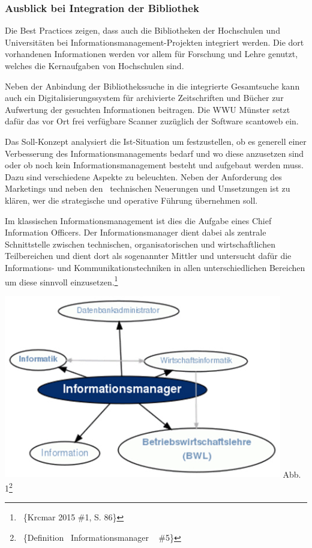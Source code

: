 \documentclass[a4paper]{article}
\begin{document}
\subsubsection{Ausblick bei Integration der Bibliothek}
{\sffamily
Die Best Practices zeigen, dass auch die Bibliotheken der Hochschulen und Universitäten bei
Informationsmanagement-Projekten integriert werden. Die dort vorhandenen Informationen werden vor allem für Forschung
und Lehre genutzt, welches die Kernaufgaben von Hochschulen sind.}

{\sffamily
Neben der Anbindung der Bibliothekssuche in die integrierte Gesamtsuche kann auch ein Digitalisierungssystem für
archivierte Zeitschriften und Bücher zur Aufwertung der gesuchten Informationen beitragen. Die WWU Münster setzt dafür
das vor Ort frei verfügbare Scanner zuzüglich der Software scantoweb ein.}


{\sffamily
Das Soll-Konzept analysiert die Ist-Situation um festzustellen, ob es generell einer Verbesserung des
Informationsmanagements bedarf und wo diese anzusetzen sind oder ob noch kein Informationsmanagement besteht und
aufgebaut werden muss. Dazu sind verschiedene Aspekte zu beleuchten. Neben der Anforderung des Marketings und neben den
\ technischen Neuerungen und Umsetzungen ist zu klären, wer die strategische und operative Führung übernehmen soll. }

\textsf{Im klassischen Informationsmanagement ist dies die Aufgabe eines Chief Information Officers. Der
Informationsmanager dient dabei als zentrale Schnittstelle zwischen technischen, organisatorischen und wirtschaftlichen
Teilbereichen und dient dort als sogenannter Mittler und untersucht dafür die Informations- und Kommunikationstechniken
in allen unterschiedlichen Bereichen um diese sinnvoll einzusetzen.}\footnote{\ \{Krcmar 2015 \#1, S. 86\}}

{\centering

\includegraphics[width=12.139cm,height=7.982cm]{VorlaufigeSollSituationeblingsprafkeluebke-img/VorlaufigeSollSituationeblingsprafkeluebke-img005.jpg}
\newline
\textsf{Abb. 1}\footnote{\ \{Definition \ Informationsmanager \ {\textbar} \#5\}\par }
\par}
\end{document}
